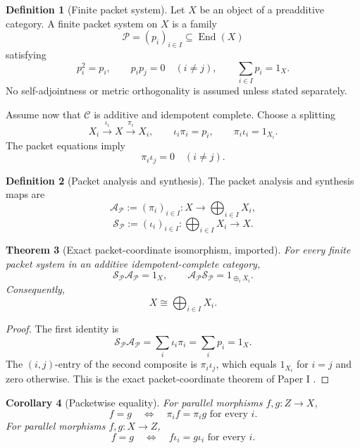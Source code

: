\documentclass[11pt]{article}
\newtheorem{theorem}{Theorem}[section]
\newtheorem{corollary}[theorem]{Corollary}
\theoremstyle{definition}
\newtheorem{definition}[theorem]{Definition}
\theoremstyle{remark}
\newcommand{\Analysis}{\mathcal A}
\newcommand{\Synthesis}{\mathcal S}
\begin{document}
\begin{definition}[Finite packet system]
\label{def:finite-packet-system-expanded}
Let \(X\) be an object of a preadditive category.  A finite packet system on \(X\) is a family
\[
\mathcal P=(p_i)_{i\in I}\subseteq\operatorname{End}(X)
\]
satisfying
\[
p_i^2=p_i,
\qquad
p_ip_j=0\quad(i\ne j),
\qquad
\sum_{i\in I}p_i=1_X.
\]
No self-adjointness or metric orthogonality is assumed unless stated separately.
\end{definition}

Assume now that \(\mathcal C\) is additive and idempotent complete.  Choose a splitting
\[
X_i\xrightarrow{\iota_i}X\xrightarrow{\pi_i}X_i,
\qquad
\iota_i\pi_i=p_i,
\qquad
\pi_i\iota_i=1_{X_i}.
\]
The packet equations imply
\[
\pi_i\iota_j=0\quad(i\ne j).
\]

\begin{definition}[Packet analysis and synthesis]
\label{def:packet-analysis-synthesis-expanded}
The packet analysis and synthesis maps are
\[
\Analysis_{\mathcal P}
:=
(\pi_i)_{i\in I}:
X\longrightarrow\bigoplus_{i\in I}X_i,
\]
\[
\Synthesis_{\mathcal P}
:=
(\iota_i)_{i\in I}:
\bigoplus_{i\in I}X_i\longrightarrow X.
\]
\end{definition}

\begin{theorem}[Exact packet-coordinate isomorphism, imported]
\label{thm:exact-packet-coordinate-expanded}
For every finite packet system in an additive idempotent-complete category,
\[
\boxed{
\Synthesis_{\mathcal P}\Analysis_{\mathcal P}=1_X,
\qquad
\Analysis_{\mathcal P}\Synthesis_{\mathcal P}
=1_{\oplus_iX_i}.}
\]
Consequently,
\[
X\cong\bigoplus_{i\in I}X_i.
\]
\end{theorem}

\begin{proof}
The first identity is
\[
\Synthesis_{\mathcal P}\Analysis_{\mathcal P}
=
\sum_i\iota_i\pi_i
=
\sum_i p_i
=
1_X.
\]
The \((i,j)\)-entry of the second composite is \(\pi_i\iota_j\), which equals \(1_{X_i}\) for \(i=j\) and zero otherwise.  This is the exact packet-coordinate theorem of Paper I \cite{P1}.
\end{proof}

\begin{corollary}[Packetwise equality]
\label{cor:packetwise-equality-expanded}
For parallel morphisms \(f,g:Z\to X\),
\[
f=g
\quad\Longleftrightarrow\quad
\pi_i f=\pi_i g\text{ for every }i.
\]
For parallel morphisms \(f,g:X\to Z\),
\[
f=g
\quad\Longleftrightarrow\quad
f\iota_i=g\iota_i\text{ for every }i.
\]
\end{corollary}
\end{document}
